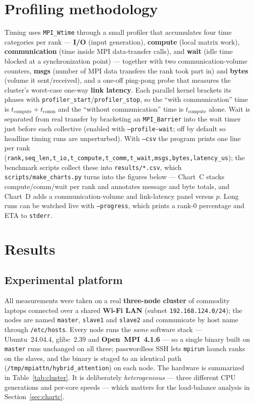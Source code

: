 \documentclass[11pt,a4paper]{article}
\newcommand{\code}[1]{\texttt{#1}}
\begin{document}
\section{Profiling methodology}
\label{sec:profiling}
Timing uses \code{MPI\_Wtime} through a small profiler that accumulates four time
categories per rank --- \textbf{I/O} (input generation), \textbf{compute} (local
matrix work), \textbf{communication} (time inside MPI data-transfer calls), and
\textbf{wait} (idle time blocked at a synchronization point) --- together with two
communication-volume counters, \textbf{msgs} (number of MPI data transfers the rank
took part in) and \textbf{bytes} (volume it sent/received), and a one-off ping-pong
probe that measures the cluster's worst-case one-way \textbf{link latency}. Each
parallel kernel brackets its phases with
\code{profiler\_start}/\code{profiler\_stop}, so the ``with communication'' time is
$t_{\text{compute}}+t_{\text{comm}}$ and the ``without communication'' time is
$t_{\text{compute}}$ alone. Wait is separated from real transfer by bracketing an
\code{MPI\_Barrier} into the wait timer just before each collective (enabled with
\code{--profile-wait}; off by default so headline timing runs are unperturbed). With
\code{--csv} the program prints one line per rank
(\code{rank,seq\_len,t\_io,t\_compute,t\_comm,t\_wait,msgs,bytes,latency\_us}); the
benchmark scripts collect these into \code{results/*.csv}, which
\code{scripts/make\_charts.py} turns into the figures below --- Chart~C stacks
compute/comm/wait per rank and annotates message and byte totals, and Chart~D adds a
communication-volume and link-latency panel versus $p$. Long runs can be watched
live with \code{--progress}, which prints a rank-0 percentage and ETA to
\code{stderr}.

\section{Results}

\subsection{Experimental platform}
\label{sec:platform}
All measurements were taken on a real \textbf{three-node cluster} of commodity
laptops connected over a shared \textbf{Wi-Fi LAN} (subnet
\code{192.168.124.0/24}); the nodes are named \code{master}, \code{slave1} and
\code{slave2} and communicate by host name through \code{/etc/hosts}. Every node
runs the \emph{same} software stack --- Ubuntu~24.04.4, glibc~2.39 and
\textbf{Open~MPI~4.1.6} --- so a single binary built on \code{master} runs
unchanged on all three; passwordless SSH lets \code{mpirun} launch ranks on the
slaves, and the binary is staged to an identical path
(\code{/tmp/mpiattn/hybrid\_attention}) on each node. The hardware is summarized
in Table~\ref{tab:cluster}. It is deliberately \emph{heterogeneous} --- three
different CPU generations and per-core speeds --- which matters for the
load-balance analysis in Section~\ref{sec:chartc}.
\end{document}

